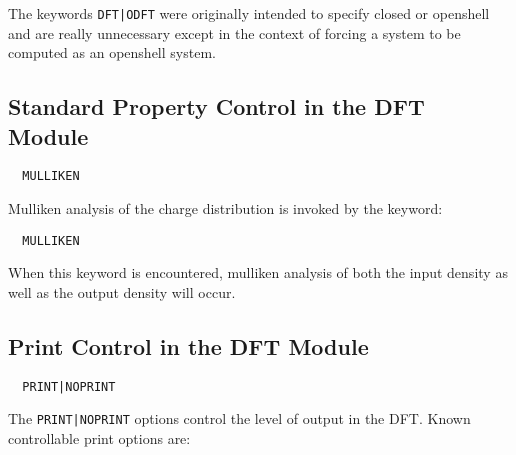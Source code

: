 The keywords \verb+DFT|ODFT+ were originally intended to specify
closed or openshell and are really unnecessary except in the context of
forcing a system to be computed as an openshell system.

\subsection{Standard Property Control in the DFT Module}
\begin{verbatim}
  MULLIKEN
\end{verbatim}

Mulliken analysis of the charge distribution is invoked by the keyword:
\begin{verbatim}
  MULLIKEN
\end{verbatim}

When this keyword is encountered, mulliken analysis of both the input 
density as well as the output density will occur.


\subsection{Print Control in the DFT Module}
\begin{verbatim}
  PRINT|NOPRINT
\end{verbatim}

The \verb+PRINT|NOPRINT+ options control the level of output in the
DFT.  Known controllable print options are:



